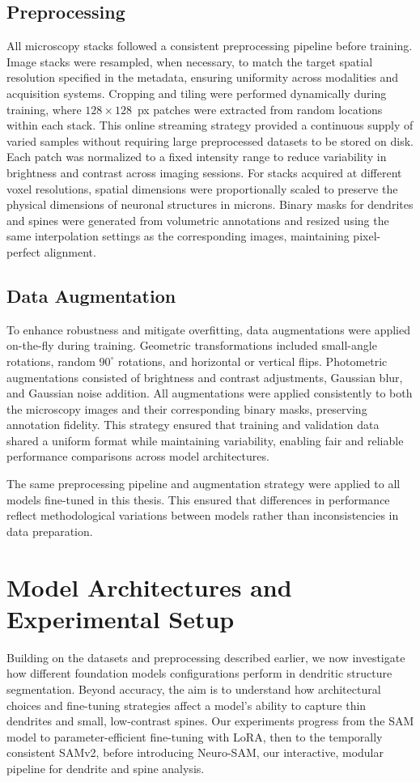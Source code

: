 \subsection{Preprocessing}
All microscopy stacks followed a consistent preprocessing pipeline before training. Image stacks were resampled, when necessary, to match the target spatial resolution specified in the metadata, ensuring uniformity across modalities and acquisition systems. Cropping and tiling were performed dynamically during training, where $128 \times 128$~px patches were extracted from random locations within each stack. This online streaming strategy provided a continuous supply of varied samples without requiring large preprocessed datasets to be stored on disk. Each patch was normalized to a fixed intensity range to reduce variability in brightness and contrast across imaging sessions. For stacks acquired at different voxel resolutions, spatial dimensions were proportionally scaled to preserve the physical dimensions of neuronal structures in microns. Binary masks for dendrites and spines were generated from volumetric annotations and resized using the same interpolation settings as the corresponding images, maintaining pixel-perfect alignment.

\subsection{Data Augmentation}
To enhance robustness and mitigate overfitting, data augmentations were applied on-the-fly during training. Geometric transformations included small-angle rotations, random $90^\circ$ rotations, and horizontal or vertical flips. Photometric augmentations consisted of brightness and contrast adjustments, Gaussian blur, and Gaussian noise addition. All augmentations were applied consistently to both the microscopy images and their corresponding binary masks, preserving annotation fidelity. This strategy ensured that training and validation data shared a uniform format while maintaining variability, enabling fair and reliable performance comparisons across model architectures.

The same preprocessing pipeline and augmentation strategy were applied to all models fine-tuned in this thesis. This ensured that differences in performance reflect methodological variations between models rather than inconsistencies in data preparation.

\section{Model Architectures and Experimental Setup}
Building on the datasets and preprocessing described earlier, we now investigate how different foundation models configurations perform in dendritic structure segmentation. Beyond accuracy, the aim is to understand how architectural choices and fine-tuning strategies affect a model’s ability to capture thin dendrites and small, low-contrast spines. Our experiments progress from the \gls{SAM} model to parameter-efficient fine-tuning with \gls{LoRA}, then to the temporally consistent \gls{SAMv2}, before introducing Neuro-\gls{SAM}, our interactive, modular pipeline for dendrite and spine analysis.

